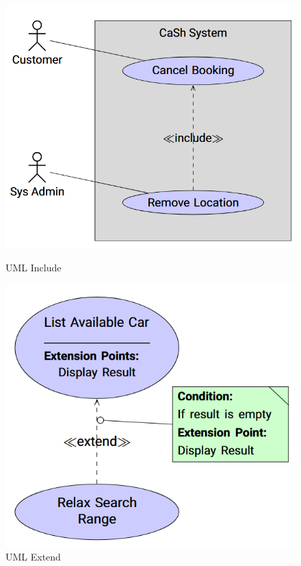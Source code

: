 \documentclass[
../../Software_Engineering_Summary.tex,
]
{subfiles}
\begin{document}
\begin{figure}[htp]
    \begin{minipage}
        [htp]{0.5\textwidth}
        \centering
        \includegraphics[scale=0.5]{Pics/03/UML_Include.png}
        \caption{UML Include}
    \end{minipage}
    \hfill
    \begin{minipage}
        [htp]{0.5\textwidth}
        \centering
        \includegraphics[scale=0.5]{Pics/03/UML_Extends.png}
        \caption{UML Extend}
    \end{minipage}
\end{figure}
\end{document}

